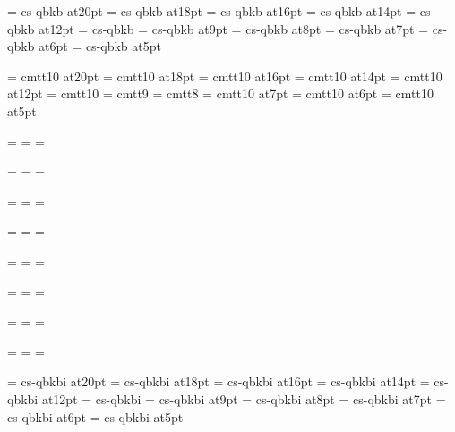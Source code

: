 \font\twentybf=     cs-qbkb at20pt
\font\eighteenbf=   cs-qbkb at18pt
\font\sixteenbf=    cs-qbkb at16pt
\font\fourteenbf=   cs-qbkb at14pt
\font\twelvebf=     cs-qbkb at12pt
\font\tenbf=        cs-qbkb
\font\ninebf=       cs-qbkb at9pt
\font\eightbf=      cs-qbkb at8pt
\font\sevenbf=      cs-qbkb at7pt
\font\sixbf=        cs-qbkb at6pt
\font\fivebf=       cs-qbkb at5pt

\font\twentytt=     cmtt10 at20pt
\font\eighteentt=   cmtt10 at18pt
\font\sixteentt=    cmtt10 at16pt
\font\fourteentt=   cmtt10 at14pt
\font\twelvett=     cmtt10 at12pt
\font\tentt=        cmtt10
\font\ninett=       cmtt9
\font\eighttt=      cmtt8
\font\seventt=      cmtt10 at7pt
\font\sixtt=        cmtt10 at6pt
\font\fivett=       cmtt10 at5pt




=\tenrm
{}=\sevenrm
{}=\fiverm
\def\rm{\fam=0 \tenrm}

=\teni
{}=\seveni
{}=\fivei
\def\mit{\fam=1}

=\elevensy
{}=\eightsy
{}=\sixsy
\def\cal{\fam=2}

=\elevenex
{}=\eightex
{}=\sixex


\def\it{\fam=\itfam \tenit}
\textfont\itfam=\tenit
\scriptfont\itfam=\sevenit
\scriptscriptfont\itfam=\fiveit

\def\sl{\fam=\slfam \tensl}
\textfont\slfam=\tensl
\scriptfont\slfam=\sevensl
\scriptscriptfont\slfam=\fivesl

\def\bf{\fam=\bffam \tenbf}
\textfont\bffam=\tenbf
\scriptfont\bffam=\sevenbf
\scriptscriptfont\bffam=\fivebf

\def\tt{\fam=\ttfam \tentt}
\textfont\ttfam=\tentt
\scriptfont\ttfam=\seventt
\scriptscriptfont\ttfam=\fivett

\font\twentyitbf=      cs-qbkbi at20pt
\font\eighteenitbf=    cs-qbkbi at18pt
\font\sixteenitbf=     cs-qbkbi at16pt
\font\fourteenitbf=    cs-qbkbi at14pt
\font\twelveitbf=      cs-qbkbi at12pt
\font\itbf=            cs-qbkbi
\font\nineitbf=        cs-qbkbi at9pt
\font\eightitbf=       cs-qbkbi at8pt
\font\sevenitbf=       cs-qbkbi at7pt
\font\sixitbf=         cs-qbkbi at6pt
\font\fiveitbf=        cs-qbkbi at5pt

